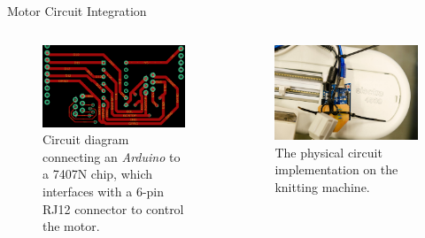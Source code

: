\documentclass[
    NAME={Dr. Helga Ingimundardóttir},
    EMAIL={helgaingim@hi.is},
    FACULTY={Industrial Engineering},
    TITLE={HiDef Textiles: Reviving Tradition with Innovation},
    SUBTITLE={Empowering Creativity and Sustainability in Textile Production through Digital Transformation},
    SEMINAR={Reykjavík DataBeers},
    DATE={January 25, 2025},
    WIDE={true}
]{HI-LaTeX/hi-beamer}
\begin{document}
    \begin{frame}{Motor Circuit Integration}
        \begin{columns}
            \begin{column}{0.5\textwidth}
                \begin{figure}
                    \centering
                    \includegraphics[width=0.9\linewidth]{include/PASSAPMOTOR.png}
                    \caption{Circuit diagram connecting an \textit{Arduino} to a 7407N chip, which interfaces with a 6-pin RJ12 connector to control the motor.}
                \end{figure}
            \end{column}
            \begin{column}{0.5\textwidth}
                \begin{figure}
                    \centering
                    \includegraphics[width=0.9\linewidth]{include/electra4600.jpg}
                    \caption{The physical circuit implementation on the knitting machine.}
                \end{figure}
            \end{column}
        \end{columns}
    \end{frame}
\end{document}
